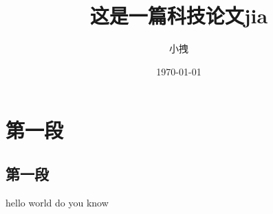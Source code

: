 \documentclass{article}[ctex]
\title{这是一篇科技论文jia}
\date{\today}
\author{小拽}
\begin{document}
\maketitle
\section{第一段}
\subsection{第一段}
hello world do you know
\end{document}
